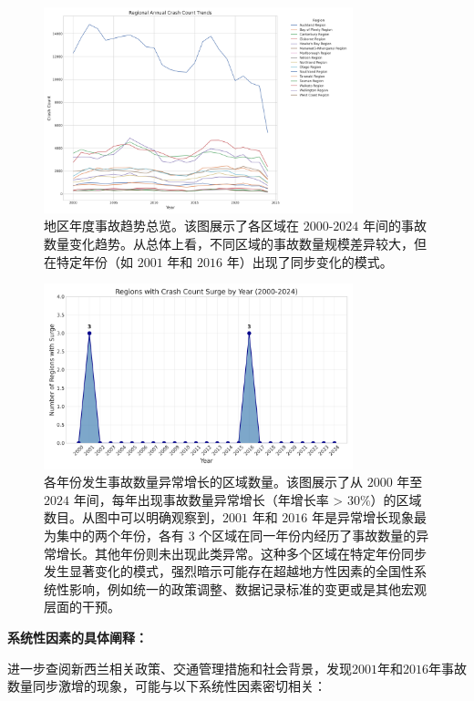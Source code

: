 \documentclass[12pt,a4paper]{article}
\begin{document}
\begin{figure}[H]
\centering
\includegraphics[width=0.8\textwidth]{region_year_trends.png}
\caption{地区年度事故趋势总览。该图展示了各区域在 $2000$-$2024$ 年间的事故数量变化趋势。从总体上看，不同区域的事故数量规模差异较大，但在特定年份（如 $2001$ 年和 $2016$ 年）出现了同步变化的模式。}
\label{fig:region_year_trends}
\end{figure}

\begin{figure}[H]
\centering
\includegraphics[width=0.8\textwidth]{year_surge_counts.png}
\caption{各年份发生事故数量异常增长的区域数量。该图展示了从 $2000$ 年至 $2024$ 年间，每年出现事故数量异常增长（年增长率 > $30\%$）的区域数目。从图中可以明确观察到，$2001$ 年和 $2016$ 年是异常增长现象最为集中的两个年份，各有 $3$ 个区域在同一年份内经历了事故数量的异常增长。其他年份则未出现此类异常。这种多个区域在特定年份同步发生显著变化的模式，强烈暗示可能存在超越地方性因素的全国性系统性影响，例如统一的政策调整、数据记录标准的变更或是其他宏观层面的干预。}
\label{fig:year_surge_counts}
\end{figure}

\textbf{系统性因素的具体阐释：}

进一步查阅新西兰相关政策、交通管理措施和社会背景，发现$2001$年和$2016$年事故数量同步激增的现象，可能与以下系统性因素密切相关：
\end{document}
